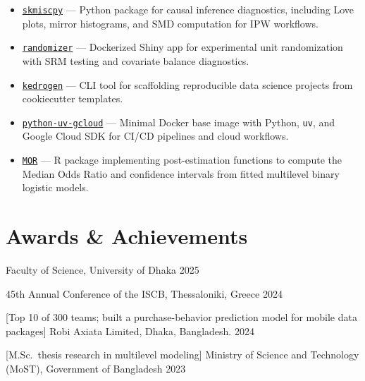 \documentclass[10pt]{article}
\begin{document}
\begin{itemize}[itemsep=2pt, parsep=0pt, topsep=0pt, leftmargin=*]

  \item \href{https://skmiscpy.readthedocs.io}{\texttt{skmiscpy}} --- Python package
        for causal inference diagnostics, including Love plots, mirror histograms,
        and SMD computation for IPW workflows.

  \item \href{https://github.com/shafayetShafee/randomizer}{\texttt{randomizer}} ---
        Dockerized Shiny app for experimental unit randomization with SRM testing
        and covariate balance diagnostics.

  \item \href{https://github.com/shafayetShafee/kedrogen}{\texttt{kedrogen}} ---
        CLI tool for scaffolding reproducible data science projects from
        cookiecutter templates.

  \item \href{https://github.com/shafayetShafee/python-uv-gcloud}{\texttt{python-uv-gcloud}} ---
        Minimal Docker base image with Python, \texttt{uv}, and Google Cloud SDK
        for CI/CD pipelines and cloud workflows.

  \item \href{https://shafayetshafee.github.io/MOR/}{\texttt{MOR}} --- R package
        implementing post-estimation functions to compute the Median Odds Ratio
        and confidence intervals from fitted multilevel binary logistic models.

\end{itemize}



\section*{Awards \& Achievements}

\begin{itemize}
            {Faculty of Science, University of Dhaka}
            {2025}

            {45th Annual Conference of the ISCB, Thessaloniki, Greece}
            {2024}

            [Top 10 of 300 teams; built a purchase-behavior prediction model for mobile data packages]
            {Robi Axiata Limited, Dhaka, Bangladesh.}
            {2024}

            [M.Sc.\ thesis research in multilevel modeling]
            {Ministry of Science and Technology (MoST), Government of Bangladesh}
            {2023}
\end{itemize}
\end{document}

